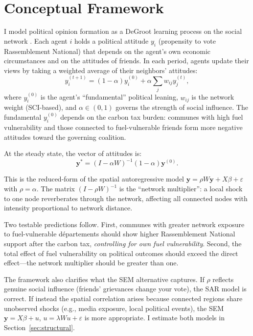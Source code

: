 \documentclass[12pt]{article}
\newcommand{\rn}{Rassemblement National}
\newcommand{\depts}{d\'{e}partements}
\begin{document}

\section{Conceptual Framework}
\label{sec:framework}

I model political opinion formation as a DeGroot learning process on the social network \citep{degroot1974reaching, golub2010naive}. Each agent $i$ holds a political attitude $y_i$ (propensity to vote \rn{}) that depends on the agent's own economic circumstances and on the attitudes of friends. In each period, agents update their views by taking a weighted average of their neighbors' attitudes:
\begin{equation}
y_i^{(t+1)} = (1 - \alpha) y_i^{(0)} + \alpha \sum_j w_{ij} y_j^{(t)},
\label{eq:degroot}
\end{equation}
where $y_i^{(0)}$ is the agent's ``fundamental'' political leaning, $w_{ij}$ is the network weight (SCI-based), and $\alpha \in (0,1)$ governs the strength of social influence. The fundamental $y_i^{(0)}$ depends on the carbon tax burden: communes with high fuel vulnerability and those connected to fuel-vulnerable friends form more negative attitudes toward the governing coalition.

At the steady state, the vector of attitudes is:
\begin{equation}
\mathbf{y}^* = (I - \alpha W)^{-1} (1-\alpha) \mathbf{y}^{(0)}.
\label{eq:steady_state}
\end{equation}

This is the reduced-form of the spatial autoregressive model $\mathbf{y} = \rho W \mathbf{y} + X\beta + \varepsilon$ with $\rho = \alpha$. The matrix $(I - \rho W)^{-1}$ is the ``network multiplier'': a local shock to one node reverberates through the network, affecting all connected nodes with intensity proportional to network distance.

Two testable predictions follow. First, communes with greater network exposure to fuel-vulnerable \depts{} should show higher \rn{} support after the carbon tax, \emph{controlling for own fuel vulnerability}. Second, the total effect of fuel vulnerability on political outcomes should exceed the direct effect---the network multiplier should be greater than one.

The framework also clarifies what the SEM alternative captures. If $\rho$ reflects genuine social influence (friends' grievances change your vote), the SAR model is correct. If instead the spatial correlation arises because connected regions share unobserved shocks (e.g., media exposure, local political events), the SEM $\mathbf{y} = X\beta + u$, $u = \lambda W u + \varepsilon$ is more appropriate. I estimate both models in Section~\ref{sec:structural}.
\end{document}
